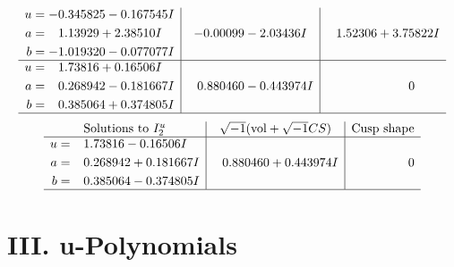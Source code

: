 \documentclass[1p]{elsarticle_modified}
\theoremstyle{definition}
\newcommand{\I}{\sqrt{-1}}
\begin{document}
$$\begin{array}{c|c|c}
\begin{aligned}
u &= -0.345825 - 0.167545 I \\
a &= \phantom{-}1.13929 + 2.38510 I \\
b &= -1.019320 - 0.077077 I\end{aligned}
 & -0.00099 - 2.03436 I & \phantom{-}1.52306 + 3.75822 I \\ \hline\begin{aligned}
u &= \phantom{-}1.73816 + 0.16506 I \\
a &= \phantom{-}0.268942 - 0.181667 I \\
b &= \phantom{-}0.385064 + 0.374805 I\end{aligned}
 & \phantom{-}0.880460 - 0.443974 I & \phantom{-0.000000 } 0\\
 \hline 
 \end{array}$$\newpage$$\begin{array}{c|c|c}  
\text{Solutions to }I^u_{2}& \I (\text{vol} + \sqrt{-1}CS) & \text{Cusp shape}\\
 \hline 
\begin{aligned}
u &= \phantom{-}1.73816 - 0.16506 I \\
a &= \phantom{-}0.268942 + 0.181667 I \\
b &= \phantom{-}0.385064 - 0.374805 I\end{aligned}
 & \phantom{-}0.880460 + 0.443974 I & \phantom{-0.000000 } 0\\
 \hline 
 \end{array}$$\newpage
\newpage\renewcommand{\arraystretch}{1}
\centering \section*{ III. u-Polynomials}
\end{document}
